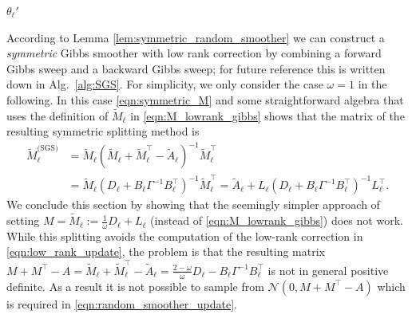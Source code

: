 \documentclass[11pt,english]{article}
\theoremstyle{plain}
\theoremstyle{plain}
\theoremstyle{plain}
\theoremstyle{plain}
\numberwithin{equation}{section}
\begin{document}
\begin{algorithm}[t!]
    \caption{Symmetric Gibbs smoother with low rank correction for Bayesian inference.\\
        Computes the update $\theta_\ell\mapsto\theta'_\ell$ by using a symmetric combination of two calls to Alg.~\ref{alg:low_rank_gibbs}.}\label{alg:SGS}
    \begin{algorithmic}[1]
        \State \Return $\theta_\ell'$
        \EndProcedure
    \end{algorithmic}
\end{algorithm}

According to Lemma \ref{lem:symmetric_random_smoother} we can construct a \textit{symmetric} Gibbs smoother with low rank correction by combining a forward Gibbs sweep and a backward Gibbs sweep; for future reference this is written down in Alg.~\ref{alg:SGS}. For simplicity, we only consider the case $\omega=1$ in the following. In this case \eqref{eqn:symmetric_M} and some straightforward algebra that uses the definition of $\widetilde{M}_\ell$ in \eqref{eqn:M_lowrank_gibbs} shows that the matrix of the resulting symmetric splitting method is
\begin{equation}
    \begin{aligned}
        \widetilde{M}_\ell^{\text{(SGS)}} & = \widetilde{M}_\ell \left(\widetilde{M}_\ell+\widetilde{M}_\ell^\top-\widetilde{A}_\ell\right)^{-1} \widetilde{M}_\ell^\top \\
                                          & = \widetilde{M}_\ell \left(D_\ell + B_{\ell} \Gamma^{-1}B_{\ell}^{\top}\right)^{-1} \widetilde{M}_\ell^\top                        %
        = \widetilde{A}_\ell + L_\ell \left(D_\ell + B_{\ell} \Gamma^{-1}B_{\ell}^{\top}\right)^{-1}L_\ell^\top.\label{eqn:SGS_splitting}
    \end{aligned}
\end{equation}
We conclude this section by showing that the seemingly simpler approach of setting $M = \widetilde{M}_\ell :=\frac{1}{\omega} D_\ell + L_\ell$ (instead of \eqref{eqn:M_lowrank_gibbs}) does not work. While this splitting avoids the computation of the low-rank correction in \eqref{eqn:low_rank_update}, the problem is that the resulting matrix $M+M^\top-A = \widetilde{M}_\ell+\widetilde{M}_\ell^\top - \widetilde{A}_\ell = \frac{2-\omega}{\omega}D_\ell - B_{\ell} \Gamma^{-1}B_{\ell}^{\top}$ is not in general positive definite. As a result it is not possible to sample from $\mathcal{N}(0,M+M^\top-A)$ which is required in \eqref{eqn:random_smoother_update}.
\end{document}
